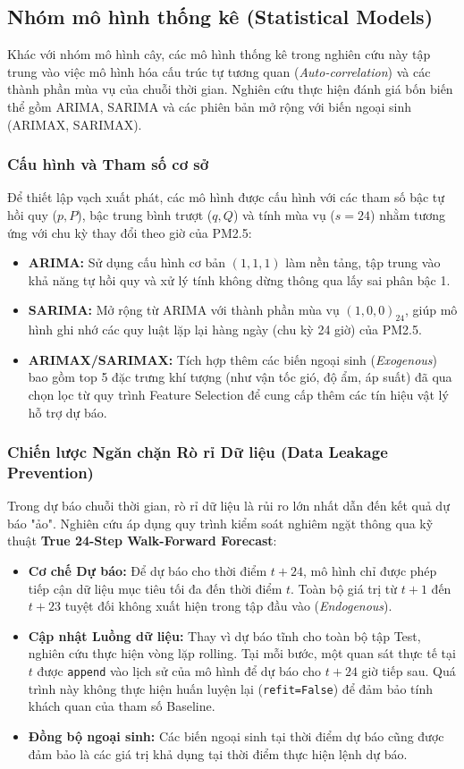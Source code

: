 \subsection{Nhóm mô hình thống kê (Statistical Models)}
Khác với nhóm mô hình cây, các mô hình thống kê trong nghiên cứu này tập trung vào việc mô hình hóa cấu trúc tự tương quan (\textit{Auto-correlation}) và các thành phần mùa vụ của chuỗi thời gian. Nghiên cứu thực hiện đánh giá bốn biến thể gồm ARIMA, SARIMA và các phiên bản mở rộng với biến ngoại sinh (ARIMAX, SARIMAX).
\subsubsection{Cấu hình và Tham số cơ sở}
Để thiết lập vạch xuất phát, các mô hình được cấu hình với các tham số bậc tự hồi quy ($p, P$), bậc trung bình trượt ($q, Q$) và tính mùa vụ ($s=24$) nhằm tương ứng với chu kỳ thay đổi theo giờ của PM2.5:
\begin{itemize}
    \item \textbf{ARIMA:} Sử dụng cấu hình cơ bản $(1, 1, 1)$ làm nền tảng, tập trung vào khả năng tự hồi quy và xử lý tính không dừng thông qua lấy sai phân bậc 1.
    \item \textbf{SARIMA:} Mở rộng từ ARIMA với thành phần mùa vụ $(1, 0, 0)_{24}$, giúp mô hình ghi nhớ các quy luật lặp lại hàng ngày (chu kỳ 24 giờ) của PM2.5.
    \item \textbf{ARIMAX/SARIMAX:} Tích hợp thêm các biến ngoại sinh (\textit{Exogenous}) bao gồm top 5 đặc trưng khí tượng (như vận tốc gió, độ ẩm, áp suất) đã qua chọn lọc từ quy trình Feature Selection để cung cấp thêm các tín hiệu vật lý hỗ trợ dự báo.
\end{itemize}
\subsubsection{Chiến lược Ngăn chặn Rò rỉ Dữ liệu (Data Leakage Prevention)}
Trong dự báo chuỗi thời gian, rò rỉ dữ liệu là rủi ro lớn nhất dẫn đến kết quả dự báo "ảo". Nghiên cứu áp dụng quy trình kiểm soát nghiêm ngặt thông qua kỹ thuật \textbf{True 24-Step Walk-Forward Forecast}:
\begin{itemize}
    \item \textbf{Cơ chế Dự báo:} Để dự báo cho thời điểm $t+24$, mô hình chỉ được phép tiếp cận dữ liệu mục tiêu tối đa đến thời điểm $t$. Toàn bộ giá trị từ $t+1$ đến $t+23$ tuyệt đối không xuất hiện trong tập đầu vào (\textit{Endogenous}).
    \item \textbf{Cập nhật Luồng dữ liệu:} Thay vì dự báo tĩnh cho toàn bộ tập Test, nghiên cứu thực hiện vòng lặp rolling. Tại mỗi bước, một quan sát thực tế tại $t$ được \texttt{append} vào lịch sử của mô hình để dự báo cho $t+24$ giờ tiếp sau. Quá trình này không thực hiện huấn luyện lại (\texttt{refit=False}) để đảm bảo tính khách quan của tham số Baseline.
    \item \textbf{Đồng bộ ngoại sinh:} Các biến ngoại sinh tại thời điểm dự báo cũng được đảm bảo là các giá trị khả dụng tại thời điểm thực hiện lệnh dự báo.
\end{itemize}
